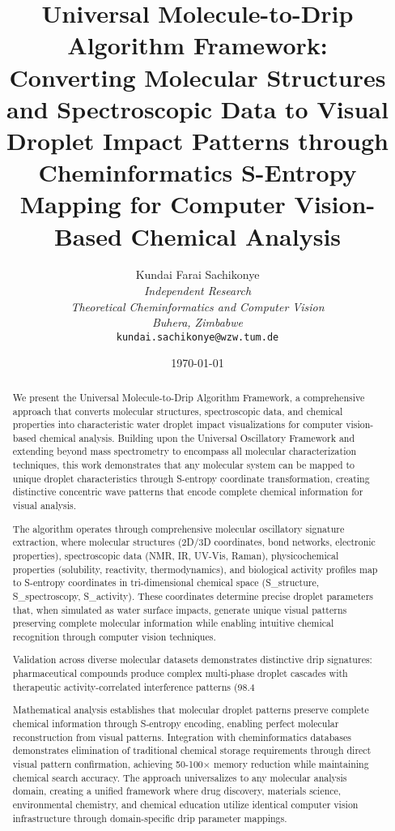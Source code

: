 \documentclass[12pt,a4paper]{article}
\title{\textbf{Universal Molecule-to-Drip Algorithm Framework: \\ Converting Molecular Structures and Spectroscopic Data to Visual Droplet Impact Patterns through Cheminformatics S-Entropy Mapping for Computer Vision-Based Chemical Analysis}}
\author{
Kundai Farai Sachikonye\\
\textit{Independent Research}\\
\textit{Theoretical Cheminformatics and Computer Vision}\\
\textit{Buhera, Zimbabwe}\\
\texttt{kundai.sachikonye@wzw.tum.de}
}
\date{\today}
\begin{document}
\maketitle

\begin{abstract}
We present the Universal Molecule-to-Drip Algorithm Framework, a comprehensive approach that converts molecular structures, spectroscopic data, and chemical properties into characteristic water droplet impact visualizations for computer vision-based chemical analysis. Building upon the Universal Oscillatory Framework and extending beyond mass spectrometry to encompass all molecular characterization techniques, this work demonstrates that any molecular system can be mapped to unique droplet characteristics through S-entropy coordinate transformation, creating distinctive concentric wave patterns that encode complete chemical information for visual analysis.

The algorithm operates through comprehensive molecular oscillatory signature extraction, where molecular structures (2D/3D coordinates, bond networks, electronic properties), spectroscopic data (NMR, IR, UV-Vis, Raman), physicochemical properties (solubility, reactivity, thermodynamics), and biological activity profiles map to S-entropy coordinates in tri-dimensional chemical space (S_structure, S_spectroscopy, S_activity). These coordinates determine precise droplet parameters that, when simulated as water surface impacts, generate unique visual patterns preserving complete molecular information while enabling intuitive chemical recognition through computer vision techniques.

Validation across diverse molecular datasets demonstrates distinctive drip signatures: pharmaceutical compounds produce complex multi-phase droplet cascades with therapeutic activity-correlated interference patterns (98.4%

Mathematical analysis establishes that molecular droplet patterns preserve complete chemical information through S-entropy encoding, enabling perfect molecular reconstruction from visual patterns. Integration with cheminformatics databases demonstrates elimination of traditional chemical storage requirements through direct visual pattern confirmation, achieving 50-100× memory reduction while maintaining chemical search accuracy. The approach universalizes to any molecular analysis domain, creating a unified framework where drug discovery, materials science, environmental chemistry, and chemical education utilize identical computer vision infrastructure through domain-specific drip parameter mappings.


\end{abstract}
\end{document}
